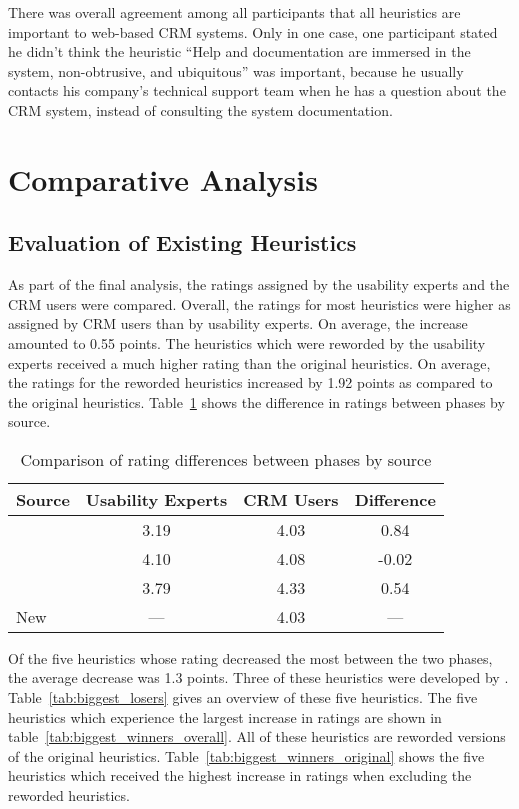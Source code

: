 There was overall agreement among all participants that all heuristics are important to web-based CRM systems. Only in one case, one participant stated he didn't think the heuristic ``Help and documentation are immersed in the system, non-obtrusive, and ubiquitous'' was important, because he usually contacts his company's technical support team when he has a question about the CRM system, instead of consulting the system documentation.

\section{Comparative Analysis}
\subsection{Evaluation of Existing Heuristics}
As part of the final analysis, the ratings assigned by the usability experts and the CRM users were compared. Overall, the ratings for most heuristics were higher as assigned by CRM users than by usability experts. On average, the increase amounted to 0.55 points. The heuristics which were reworded by the usability experts received a much higher rating than the original heuristics. On average, the ratings for the reworded heuristics increased by 1.92 points as compared to the original heuristics. Table~\ref{tab:rating_difference_bysource} shows the difference in ratings between phases by source.

\begin{table}[htbp]
	\centering
	\vspace{0.5cm}
	\caption{Comparison of rating differences between phases by source}
	\label{tab:rating_difference_bysource}
	\begin{tabular}{lccc}	\toprule
		\textbf{Source} & \textbf{Usability Experts} & \textbf{CRM Users} & \textbf{Difference} \\ \midrule
		\citet{Ardito2006} 		& 3.19 	& 4.03 &  0.84 	\\
		\citet{Nielsen1994a} 	& 4.10 	& 4.08 & -0.02 	\\
		\citet{Singh2009} 		& 3.79 	& 4.33 &  0.54 	\\
		New 					&  ---	& 4.03 &   ---	\\
		\bottomrule
	\end{tabular}
\end{table}

Of the five heuristics whose rating decreased the most between the two phases, the average decrease was 1.3 points. Three of these heuristics were developed by \citet{Nielsen1994a}. Table~\ref{tab:biggest_losers} gives an overview of these five heuristics. The five heuristics which experience the largest increase in ratings are shown in table~\ref{tab:biggest_winners_overall}. All of these heuristics are reworded versions of the original heuristics. Table~\ref{tab:biggest_winners_original} shows the five heuristics which received the highest increase in ratings when excluding the reworded heuristics.

